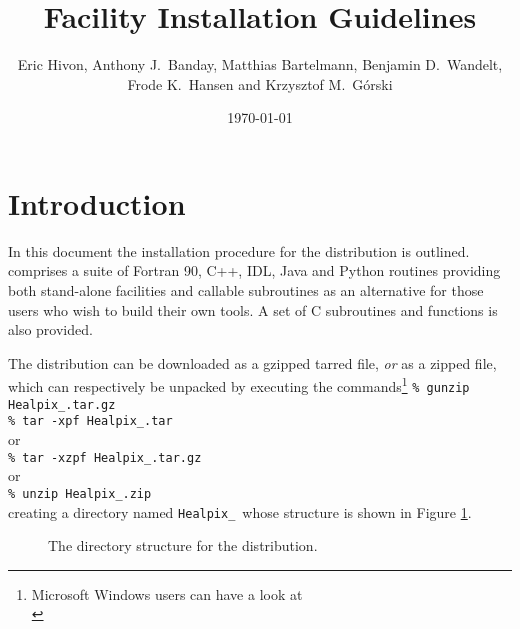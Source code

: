 \documentclass[12pt,twoside]{article}
\begin{document}
\title{\healpix Facility Installation Guidelines}
\author{Eric Hivon, Anthony J.~Banday, Matthias Bartelmann, Benjamin D.~Wandelt,
Frode K.~Hansen and Krzysztof M.~G\'orski}
%
\date{\today}

\frontpage
\tableofcontents
\newpage

\section{Introduction}

In this document the installation procedure for the \healpix
distribution is outlined. \healpix comprises a suite of Fortran 90, C++, 
IDL, Java and Python routines
providing both stand-alone facilities and callable subroutines as an alternative
for those users who wish to build their own tools.
A set of C subroutines and functions is also provided. 

The distribution can be downloaded as a gzipped tarred file, {\em or} as a zipped file,
which can respectively be unpacked by executing the commands\footnote{Microsoft Windows users can have a look at \\
} \hfill\newline
\texttt{\% gunzip Healpix\_\hpxversion.tar.gz}\hfill\\
\texttt{\% tar -xpf Healpix\_\hpxversion.tar}\hfill\\
or \hfill\\
\texttt{\% tar -xzpf Healpix\_\hpxversion.tar.gz}\hfill\\
or \hfill\\
\texttt{\% unzip Healpix\_\hpxversion.zip}\hfill\\
creating a directory named \texttt{Healpix\_\hpxversion}\ whose structure is shown in Figure
\ref{fig:dirtree}.

\begin{figure}[!ht]
\caption[Directory structure]{%
\label{page:dirtree}
\label{fig:dirtree} %
The directory structure for the \healpix distribution. }
\end{figure}
\end{document}

